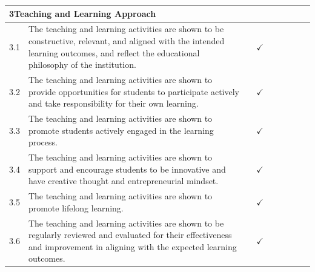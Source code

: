 \begin{longtable}{|p{0.6cm}|>{\raggedright\arraybackslash}p{9.2cm}|c|c|c|c|c|c|c|}
  \multicolumn{9}{|l|}{\cellcolor{gray!15}\textbf{3\quad Teaching and Learning Approach}} \\
  \hline
  3.1 & The teaching and learning activities are shown to be constructive, relevant, and aligned with the intended learning outcomes, and reflect the educational philosophy of the institution. & & $\checkmark$ & & & & & \\
  \hline
  3.2 & The teaching and learning activities are shown to provide opportunities for students to participate actively and take responsibility for their own learning. & & $\checkmark$ & & & & & \\
  \hline
  3.3 & The teaching and learning activities are shown to promote students actively engaged in the learning process. & & $\checkmark$ & & & & & \\
  \hline
  3.4 & The teaching and learning activities are shown to support and encourage students to be innovative and have creative thought and entrepreneurial mindset. & & $\checkmark$ & & & & & \\
  \hline
  3.5 & The teaching and learning activities are shown to promote lifelong learning. & & $\checkmark$ & & & & & \\
  \hline
  3.6 & The teaching and learning activities are shown to be regularly reviewed and evaluated for their effectiveness and improvement in aligning with the expected learning outcomes. & & $\checkmark$ & & & & & \\
  \hline


\end{longtable}
